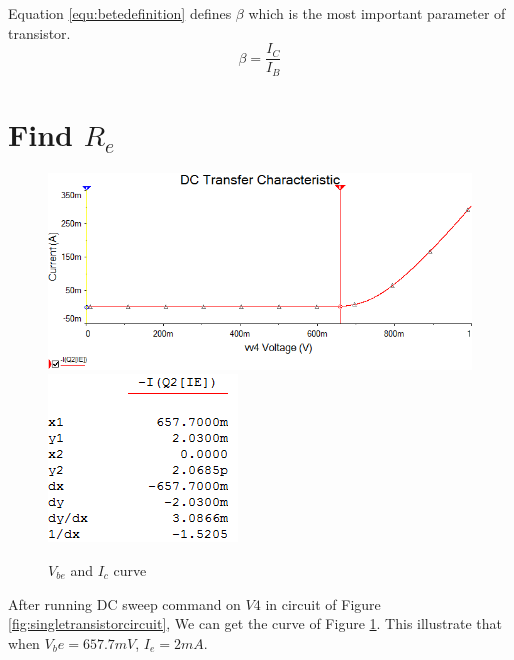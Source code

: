  Equation \ref{equ:betedefinition} defines $\beta$ which is the most important parameter of transistor.  
\begin{equation}
\beta = \frac{I_C}{I_B}
\label{equ:betedefinition}
\end{equation}

\section{Find $ R_e $ }

\begin{figure}[htbp]
  \centering
  \includegraphics[scale=0.7]{"../Photo/Chap1/Ie is 2 mA Vbe is 657mV"}\\[0.5cm]
  \includegraphics[scale=1]{"../Photo/Chap1/Ie is 2 mA Vbe is 657mV data"}
  \caption{$ V_{be} $ and $ I_c $ curve}
  \label{fig:VbeandIccurve}
\end{figure}

After running DC sweep command on $ V4 $ in circuit of Figure \ref{fig:singletransistorcircuit}, We can get the curve of Figure \ref{fig:VbeandIccurve}. This illustrate that when $ V_be = 657.7 mV $, $ I_e = 2 mA $.

